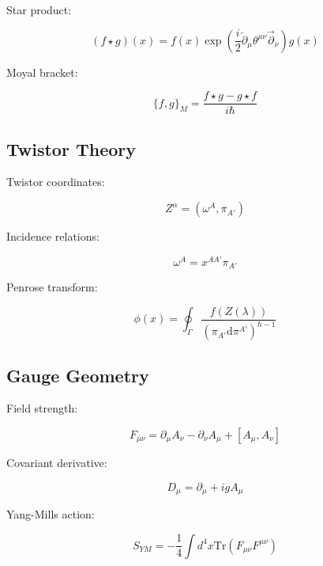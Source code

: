 \documentclass[12pt]{article}
\newcommand{\tr}{\text{Tr}}
\newcommand{\dd}{\mathrm{d}}
\begin{document}
Star product:

\begin{equation}
(f \star g)(x) = f(x)\exp\left(\frac{i}{2}\overleftarrow{\partial}_\mu\theta^{\mu\nu}\overrightarrow{\partial}_\nu\right)g(x)
\end{equation}

Moyal bracket:

\begin{equation}
\{f,g\}_M = \frac{f \star g - g \star f}{i\hbar}
\end{equation}

\subsection{Twistor Theory}

Twistor coordinates:

\begin{equation}
Z^\alpha = (\omega^A, \pi_{A'})
\end{equation}

Incidence relations:

\begin{equation}
\omega^A = x^{AA'}\pi_{A'}
\end{equation}

Penrose transform:

\begin{equation}
\phi(x) = \oint_\Gamma \frac{f(Z(\lambda))}{(\pi_{A'}\dd\pi^{A'})^{h-1}}
\end{equation}

\subsection{Gauge Geometry}

Field strength:

\begin{equation}
F_{\mu\nu} = \partial_\mu A_\nu - \partial_\nu A_\mu + [A_\mu, A_\nu]
\end{equation}

Covariant derivative:

\begin{equation}
D_\mu = \partial_\mu + igA_\mu
\end{equation}

Yang-Mills action:

\begin{equation}
S_{YM} = -\frac{1}{4}\int d^4x \tr(F_{\mu\nu}F^{\mu\nu})
\end{equation}
\end{document}
